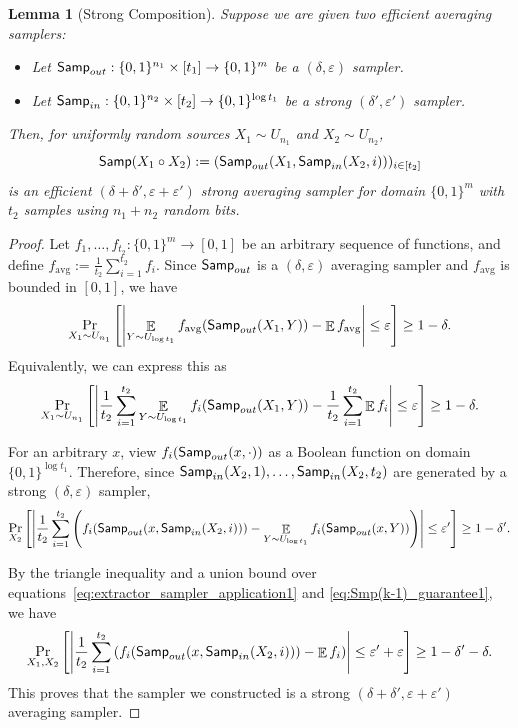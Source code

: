 \documentclass[10pt,a4paper]{article}
\newtheorem{lemma}[theorem]{Lemma}
\DeclareMathOperator*{\E}{\mathbb{E}}
\newcommand{\eps}{\varepsilon}
\newcommand{\1}{\mathbbm{1}}
\newcommand{\abs}[1]{\left|#1\right| }
\newcommand{\tuple}[1]{\left(#1\right)}
\newcommand{\zo}{\{0, 1\}}
\newcommand{\Smp}{\textup{\textsf{Samp}}}
\newcommand{\Prb}[2][]{\Pr_{#1}\left[#2\right]}
\begin{document}
\begin{lemma}[Strong Composition]
    \label{lem:new_NZ}
    Suppose we are given two efficient averaging samplers:
\begin{itemize}
    \item  Let $\Smp_{out}: \zo^{n_1} \times [t_1] \to \zo^m$ be a $(\delta, \eps)$ sampler.
    \item Let $\Smp_{in}: \zo^{n_2} \times [t_2] \to \zo^{\log t_1}$ be a strong $(\delta', \eps')$ sampler.
\end{itemize}
 Then, for uniformly random sources $X_{1} \sim U_{n_1}$ and $X_{2} \sim U_{n_2}$, \[
        \Smp(X_1 \circ X_2):= (\Smp_{out}(X_1, \Smp_{in}(X_2, i)))_{i \in [t_2]}
    \]
    is an efficient $(\delta + \delta', \eps + \eps')$ strong averaging sampler for domain $\zo^m$ with $t_2$ samples using $n_1 + n_2$ random bits. 
\end{lemma}



\begin{proof}
    Let $f_1, \dots, f_{t_2} :  \zo^m \to [0, 1]$ be an arbitrary sequence of functions, and define $f_{\text{avg}} := \frac{1}{t_2} \sum_{i=1}^{t_2} f_{i}$.
    Since $\Smp_{out}$ is a $(\delta, \eps)$ averaging sampler and $f_{\text{avg}}$ is bounded in $[0, 1]$, we have \[
        \Prb[X_1 \sim U_{n_1}]{\abs{\E_{Y \sim U_{\log t_1}}{f_{\text{avg}}(\Smp_{out}(X_1, Y))} - \E f_{\text{avg}}} \le {\eps}} \ge 1 - \delta.
    \]
    Equivalently, we can express this as 
    \begin{equation}
        \label{eq:extractor_sampler_application1}
       \Prb[X_1 \sim U_{n_1}]{\abs{\frac{1}{t_2}\sum_{i=1}^{t_2} \E_{Y \sim U_{\log t_1}}{f_i(\Smp_{out}(X_1, Y))} - \frac{1}{t_2}\sum_{i=1}^{t_2} \E f_{i}} \le {\eps}} \ge 1 - \delta.
    \end{equation}
    
    For an arbitrary $x$, view $f_i(\Smp_{out}(x, \cdot))$  as a Boolean function on domain $\zo^{\log t_1}$. Therefore, since $\Smp_{in}(X_2, 1), \dots, \Smp_{in}(X_2, t_2)$ are generated by a strong $(\delta, \eps)$ sampler,
    \begin{equation}
        \label{eq:Smp(k-1)_guarantee1}
        \Pr_{X_2}\left[{\abs{\frac{1}{t_2}\sum_{i=1}^{t_2} \tuple{f_i(\Smp_{out}(x, \Smp_{in}(X_2, i))) - \E_{Y \sim U_{\log t_1}}{f_i(\Smp_{out}(x, Y))}}} \le {\eps'}}\right] \ge 1 - {\delta'}.
    \end{equation}
  
    By the triangle inequality and a union bound over equations~\eqref{eq:extractor_sampler_application1} and \eqref{eq:Smp(k-1)_guarantee1}, we have \[
    \Prb[X_1, X_2]{
       \abs{\frac{1}{t_2}\sum_{i=1}^{t_2}\tuple{ f_i(\Smp_{out}(x, \Smp_{in}(X_2, i)))  - \E f_i}} \le \eps' + \eps} \ge 1 - \delta' - \delta .
    \]
    This proves that the sampler we constructed is a strong $(\delta + \delta', \eps + \eps')$ averaging sampler.
\end{proof}
\end{document}
